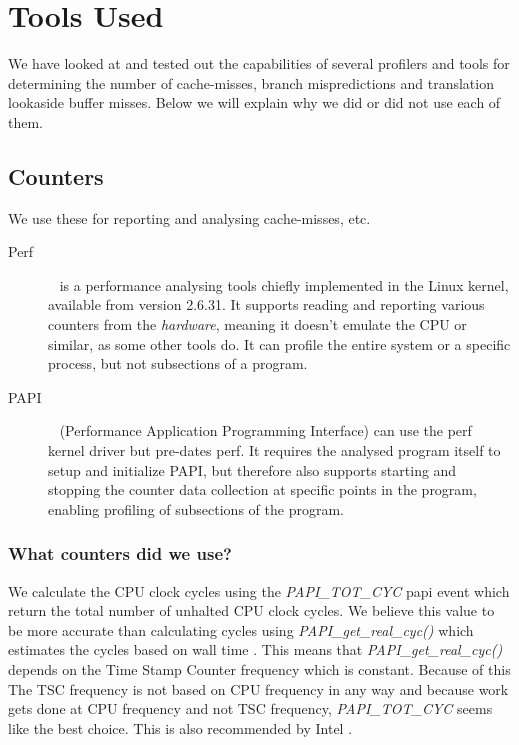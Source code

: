 \section{Tools Used}
We have looked at and tested out the capabilities of several profilers and tools for determining the number of cache-misses, branch mispredictions and translation lookaside buffer misses.
Below we will explain why we did or did not use each of them.


\subsection{Counters}
We use these for reporting and analysing cache-misses, etc.
\begin{description}
\item[Perf]~\citep{perftool} is a performance analysing tools chiefly implemented in the Linux kernel, available from version 2.6.31.
It supports reading and reporting various counters from the \textit{hardware}, meaning it doesn't emulate the CPU or similar, as some other tools do.
It can profile the entire system or a specific process, but not subsections of a program.
\item[PAPI]~\citep{PAPI} (Performance Application Programming Interface) can use the perf kernel driver but pre-dates perf.
It requires the analysed program itself to setup and initialize PAPI, but therefore also supports starting and stopping the counter data collection at specific points in the program, enabling profiling of subsections of the program.
\end{description}

\subsubsection{What counters did we use?}
We calculate the CPU clock cycles using the \textit{PAPI\_TOT\_CYC} papi event which return the total number of unhalted CPU clock cycles. 
We believe this value to be more accurate than calculating cycles using \textit{PAPI\_get\_real\_cyc()} which estimates the cycles based on wall time \citep{PAPI-get-real-cyc}. 
This means that \textit{PAPI\_get\_real\_cyc()} depends on the Time Stamp Counter frequency which is constant. 
Because of this The TSC frequency is not based on CPU frequency in any way and because work gets done at CPU frequency and not TSC frequency, \textit{PAPI\_TOT\_CYC} seems like the best choice. 
This is also recommended by Intel \citep{IntelMeasuringTheAverageUnhaltedFrequency}.

